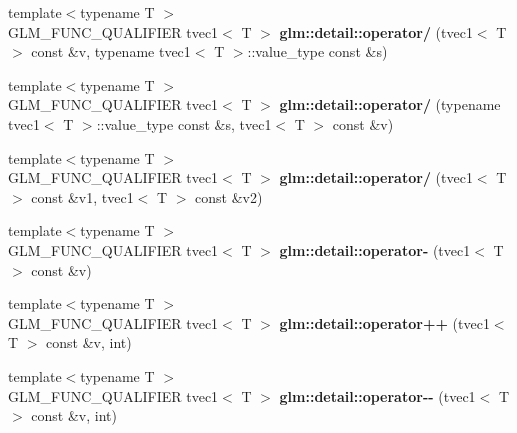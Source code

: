 \begin{DoxyCompactItemize}
\item 
\hypertarget{namespaceglm_1_1detail_ac91309d88faf4b29df645cd31148aee7}{{\footnotesize template$<$typename T $>$ }\\\-G\-L\-M\-\_\-\-F\-U\-N\-C\-\_\-\-Q\-U\-A\-L\-I\-F\-I\-E\-R tvec1$<$ \-T $>$ {\bfseries glm\-::detail\-::operator/} (tvec1$<$ \-T $>$ const \&v, typename tvec1$<$ \-T $>$\-::value\-\_\-type const \&s)}\label{namespaceglm_1_1detail_ac91309d88faf4b29df645cd31148aee7}

\item 
\hypertarget{namespaceglm_1_1detail_a21509cda8560c565139f8b835d9f66e0}{{\footnotesize template$<$typename T $>$ }\\\-G\-L\-M\-\_\-\-F\-U\-N\-C\-\_\-\-Q\-U\-A\-L\-I\-F\-I\-E\-R tvec1$<$ \-T $>$ {\bfseries glm\-::detail\-::operator/} (typename tvec1$<$ \-T $>$\-::value\-\_\-type const \&s, tvec1$<$ \-T $>$ const \&v)}\label{namespaceglm_1_1detail_a21509cda8560c565139f8b835d9f66e0}

\item 
\hypertarget{namespaceglm_1_1detail_aee9243f682c096dbae3ce672b811750f}{{\footnotesize template$<$typename T $>$ }\\\-G\-L\-M\-\_\-\-F\-U\-N\-C\-\_\-\-Q\-U\-A\-L\-I\-F\-I\-E\-R tvec1$<$ \-T $>$ {\bfseries glm\-::detail\-::operator/} (tvec1$<$ \-T $>$ const \&v1, tvec1$<$ \-T $>$ const \&v2)}\label{namespaceglm_1_1detail_aee9243f682c096dbae3ce672b811750f}

\item 
\hypertarget{namespaceglm_1_1detail_ac31957ab3e113b6049b68234fca9f67f}{{\footnotesize template$<$typename T $>$ }\\\-G\-L\-M\-\_\-\-F\-U\-N\-C\-\_\-\-Q\-U\-A\-L\-I\-F\-I\-E\-R tvec1$<$ \-T $>$ {\bfseries glm\-::detail\-::operator-\/} (tvec1$<$ \-T $>$ const \&v)}\label{namespaceglm_1_1detail_ac31957ab3e113b6049b68234fca9f67f}

\item 
\hypertarget{namespaceglm_1_1detail_a574ce6893275a07cba6d8bb7c65c09c7}{{\footnotesize template$<$typename T $>$ }\\\-G\-L\-M\-\_\-\-F\-U\-N\-C\-\_\-\-Q\-U\-A\-L\-I\-F\-I\-E\-R tvec1$<$ \-T $>$ {\bfseries glm\-::detail\-::operator++} (tvec1$<$ \-T $>$ const \&v, int)}\label{namespaceglm_1_1detail_a574ce6893275a07cba6d8bb7c65c09c7}

\item 
\hypertarget{namespaceglm_1_1detail_a56c5b1a5cb56bbecd799d234d43eec7a}{{\footnotesize template$<$typename T $>$ }\\\-G\-L\-M\-\_\-\-F\-U\-N\-C\-\_\-\-Q\-U\-A\-L\-I\-F\-I\-E\-R tvec1$<$ \-T $>$ {\bfseries glm\-::detail\-::operator-\/-\/} (tvec1$<$ \-T $>$ const \&v, int)}\label{namespaceglm_1_1detail_a56c5b1a5cb56bbecd799d234d43eec7a}


\end{DoxyCompactItemize}
